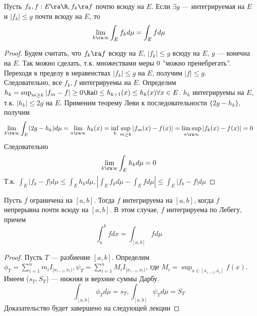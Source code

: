 \begin{theorem}
    Пусть \(f_k, f: E \ra \R, f_k \ra f\) почтю всюду на \(E\). Если \(\exists g\) --- интегрируемая на \(E\) и \(|f_k| \le g\) почти всюду на \(E\), то
    \[\lim_{k \ra \infty}\int_E f_k d \mu = \int_E f d \mu\]
\end{theorem}
\begin{proof}
    Будем считать, что \(f_k \ra f\) всюду на \(E\), \(|f_k| \le g\) всюду на \(E\), \(g\) --- конечна на \(E\). Так можно сделать, т.к. множествами меры 0 ''можно пренебрегать''. Переходя к пределу в неравенствах \(|f_k| \le g\) на \(E\), получим \(|f| \le g\). Следовательно, все \(f_k, f\) интегрируемы на \(E\). Определим \(h_k = \sup_{m \ge k}|f_m - f| \ge 0 \Ra 0 \le h_{k + 1}(x) \le h_k(x) \forall x \in E\). \(h_k\) интегрируемы на \(E\), т.к. \(|h_k| \le 2g\) на \(E\). Применим теорему Леви к последовательности \(\{2g - h_k\}\), получим
    \[\lim_{k \ra \infty} \int_E (2g - h_k)d \mu = \lim_{n \ra \infty} h_k(x) = \inf_k \sup_{m \ge k} |f_m(x) - f(x)| = \limsup_{n \ra \infty} |f_k(x) - f(x)| = 0\]
    Следовательно
    \[\lim_{k \ra \infty} \int_E h_k d \mu = 0\]
    Т.к. \(\int_E |f_k - f| d \mu \le \int_E h_k d \mu, \left|\int_E f_k d \mu - \int_E f d \mu\right| \le \int_E |f_k - f| d \mu\)
\end{proof}

\begin{theorem}
    Пусть \(f\) ограничена на \([a, b]\). Тогда \(f\) интегрируема на \([a, b]\), когда \(f\) непрерывна почти всюду на \([a, b]\). В этом случае, \(f\) интегрируема по Лебегу, причем
    \[\int_a^b fdx = \int_{[a, b]} fd\mu\]
\end{theorem}
\begin{proof}
    Пусть \(T\) --- разбиение \([a, b]\). Определим \(\phi_T = \sum_{i = 1}^n m_iI_{[x_{i - 1}, x_i)}, \psi_T = \sum_{i = 1}^n M_iI_{[x_{i - 1}, x_i)}\), где \(M_i = \sup_{x \in [x_{i - 1}, x_i]}f(x)\). Имеем (\(s_T, S_T\)) --- нижняя и верхние суммы Дарбу.
    \[\int_{[a, b]}\phi_T d \mu = s_T, \int_{[a, b]}\psi_T d \mu = S_T\]
    Доказательство будет завершено на следующей лекции
\end{proof}
